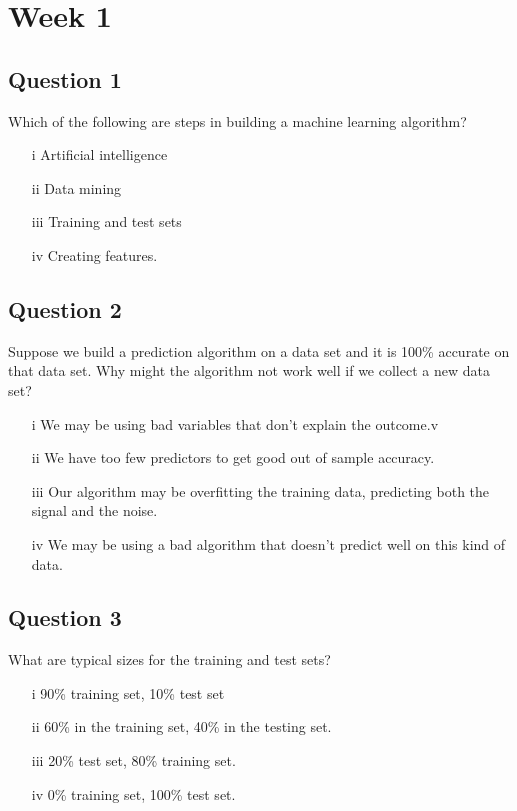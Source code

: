 \documentclass[DSS8main.tex]{subfiles}
\begin{document}
\section{Week 1}
\subsection*{Question 1}
Which of the following are steps in building a machine learning algorithm?

\begin{itemize}
\item[i] Artificial intelligence
\item[ii] Data mining
\item[iii] Training and test sets
\item[iv] Creating features.
\end{itemize}
\subsection*{Question 2}
Suppose we build a prediction algorithm on a data set and it is 100\% accurate on that data set. Why might the algorithm not work well if we collect a new data set?
\begin{itemize}
\item[i] We may be using bad variables that don't explain the outcome.v
\item[ii] We have too few predictors to get good out of sample accuracy.
\item[iii] Our algorithm may be overfitting the training data, predicting both the signal and the noise.
\item[iv] We may be using a bad algorithm that doesn't predict well on this kind of data.
\end{itemize}
\subsection*{Question 3}
What are typical sizes for the training and test sets?
\begin{itemize}
\item[i] 90\% training set, 10\% test set
\item[ii] 60\% in the training set, 40\% in the testing set.
\item[iii] 20\% test set, 80\% training set.
\item[iv] 0\% training set, 100\% test set.
\end{itemize}
\end{document}
